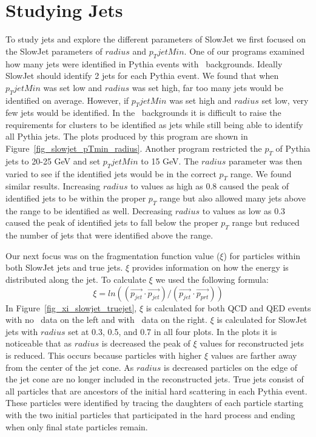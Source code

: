 \documentclass[11pt]{article}
\begin{document}
\section{Studying Jets}
%
%
To study jets and explore the different parameters of SlowJet we first focused on the SlowJet parameters of $radius$ and $p_TjetMin$. One of our programs examined how many jets were identified in Pythia events with \trento\ backgrounds. Ideally SlowJet should identify 2 jets for each Pythia event. We found that when $p_TjetMin$ was set low and $radius$ was set high, far too many jets would be identified on average. However, if $p_TjetMin$ was set high and $radius$ set low, very few jets would be identified. In the \trento\ backgrounds it is difficult to raise the requirements for clusters to be identified as jets while still being able to identify all Pythia jets. The plots produced by this program are shown in Figure~\ref{fig_slowjet_pTmin_radius}. Another program restricted the $p_T$ of Pythia jets to 20-25 GeV and set $p_TjetMin$ to 15 GeV. The $radius$ parameter was then varied to see if the identified jets would be in the correct $p_T$ range. We found similar results. Increasing $radius$ to values as high as 0.8 caused the peak of identified jets to be within the proper $p_T$ range but also allowed many jets above the range to be identified as well. Decreasing $radius$ to values as low as 0.3 caused the peak of identified jets to fall below the proper $p_T$ range but reduced the number of jets that were identified above the range.

Our next focus was on the fragmentation function value ($\xi$) for particles within both SlowJet jets and true jets. $\xi$ provides information on how the energy is distributed along the jet. To calculate $\xi$ we used the following formula:
\[\xi = ln((\vec{p_{jet}} \cdot \vec{p_{jet}})/(\vec{p_{jet}} \cdot \vec{p_{prt}}))\]
In Figure~\ref{fig_xi_slowjet_truejet}, $\xi$ is calculated for both QCD and QED events with no \trento\ data on the left and with \trento\ data on the right. $\xi$ is calculated for SlowJet jets with $radius$ set at 0.3, 0.5, and 0.7 in all four plots. In the plots it is noticeable that as $radius$ is decreased the peak of $\xi$ values for reconstructed jets is reduced. This occurs because particles with higher $\xi$ values are farther away from the center of the jet cone. As $radius$ is decreased particles on the edge of the jet cone are no longer included in the reconstructed jets. True jets consist of all particles that are ancestors of the initial hard scattering in each Pythia event. These particles were identified by tracing the daughters of each particle starting with the two initial particles that participated in the hard process and ending when only final state particles remain.
\end{document}
